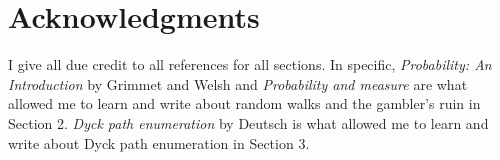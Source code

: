 \documentclass[12pt]{article}
\theoremstyle{definition}
\numberwithin{equation}{section}
\begin{document}





\pagebreak

\section*{Acknowledgments}

I give all due credit to all references for all sections. In specific, \emph{Probability: An Introduction} by Grimmet and Welsh and \emph{Probability and measure} are what allowed me to learn and write about random walks and the gambler's ruin in Section 2. \emph{Dyck path enumeration} by Deutsch is what allowed me to learn and write about Dyck path enumeration in Section 3.
\end{document}
